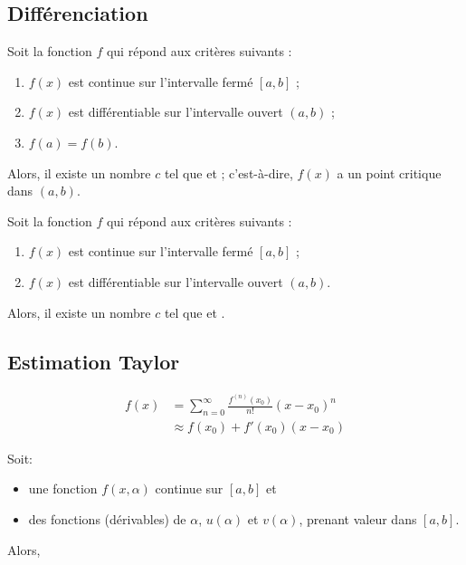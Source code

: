 \documentclass[10pt, french]{article}
\begin{document}
\begin{multicols*}{2}
\subsection{Différenciation}
\begin{rappel_enhanced}
\begin{rappel_enhanced}
Soit la fonction $f$ qui répond aux critères suivants :
\begin{enumerate}
	\item	$f(x)$ est continue sur l'intervalle fermé $[a, b]$ ;
	\item	$f(x)$ est différentiable sur l'intervalle ouvert $(a, b)$ ;
	\item	$f(a)	=	f(b)$.
\end{enumerate}
Alors, il existe un nombre $c$ tel que  et ; c'est-à-dire, $f(x)$ a un point critique dans $(a, b)$.
\end{rappel_enhanced}

Soit la fonction $f$ qui répond aux critères suivants :
\begin{enumerate}
	\item	$f(x)$ est continue sur l'intervalle fermé $[a, b]$ ;
	\item	$f(x)$ est différentiable sur l'intervalle ouvert $(a, b)$.
\end{enumerate}
Alors, il existe un nombre $c$ tel que  et .
\end{rappel_enhanced}


\subsection*{Estimation Taylor}
\begin{align*}
	f(x) 
		&=	\sum_{n = 0}^{\infty} \frac{f^{(n)}(x_0)}{n!}(x - x_0)^{n} \\
		&\approx f(x_0) + f'(x_0) (x - x_0)
\end{align*}

\begin{definitionNOHFILL}
Soit: 
\begin{itemize}
	\item 	une fonction $f(x, \alpha)$ continue sur $[a, b]$ et
	\item des fonctions (dérivables) de $\alpha$, $u(\alpha)$ et $v(\alpha)$, prenant valeur dans $[a, b]$.
\end{itemize}
Alors,


\end{definitionNOHFILL}
\end{multicols*}
\end{document}
